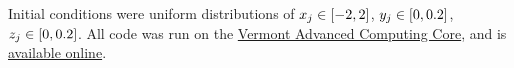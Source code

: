 Initial conditions were uniform distributions of $x_{j} \in \bqty{-2, 2}$, $y_{j} \in \bqty{0, 0.2}$, $z_{j} \in \bqty{0, 0.2}$.
All code was run on the \href{https://www.uvm.edu/vacc}{Vermont Advanced Computing Core}, and is \href{https://gitlab.uvm.edu/Henry.Mitchell/thesis}{available online}.

